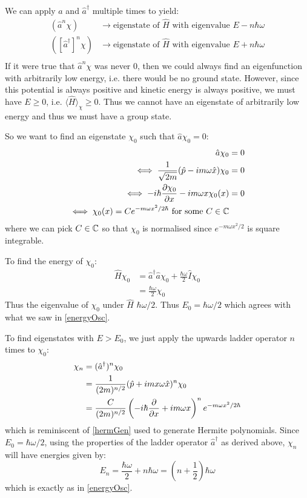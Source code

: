 \documentclass[../main.tex]{subfiles}
\begin{document}
We can apply $\hat{a}$ and $\hat{a}^{\dag}$ multiple times to yield:
\begin{align*}
  (\hat{a}^{n} \chi) &\to \text{eigenstate of $\hat{H}$ with eigenvalue } E - n \hbar \omega \\
  ([\hat{a}^{\dag}]^{n} \chi) &\to \text{eigenstate of $\hat{H}$ with eigenvalue } E + n \hbar \omega \\
\end{align*}
If it were true that $\hat{a}^{n} \chi$ was never 0, then we could always find an eigenfunction with arbitrarily low energy, i.e. there would be no ground state.
However, since this potential is always positive and kinetic energy is always positive, we must have $E \geq 0$, i.e. $\langle \hat{H} \rangle_{\chi} \geq 0$.
Thus we cannot have an eigenstate of arbitrarily low energy and thus we must have a group state.

So we want to find an eigenstate $\chi_0$ such that $\hat{a} \chi_0 = 0$:
\begin{align*}
  \hat{a} \chi_0 &= 0 \\
  \iff \frac{1}{\sqrt{2m}}(\hat{p} - im\omega\hat{x})\chi_0 &= 0 \\
  \iff -i\hbar \pderiv{\chi_0}{x} - im\omega x\chi_{0}(x) &= 0 \\
  \iff \chi_0(x) = Ce^{-m\omega x^2/2\hbar} \text{ for some } C \in \C
\end{align*}
where we can pick $C \in \mathbb{C}$ so that $\chi_0$ is normalised since $e^{-m\omega x^2/2}$ is square integrable.

To find the energy of $\chi_0$:
\begin{align*}
  \hat{H} \chi_0 &= \hat{a}^{\dag} \hat{a} \chi_0 + \frac{\hbar \omega}{2} \hat{I} \chi_0 \\
                 &= \frac{\hbar \omega}{2} \chi_0
\end{align*}
Thus the eigenvalue of $\chi_0$ under $\hat{H}$ $\hbar\omega/2$.
Thus $E_0 = \hbar \omega/2$ which agrees with what we saw in \cref{energyOsc}.

To find eigenstates with $E > E_0$, we just apply the upwards ladder operator $n$ times to $\chi_0$:
\begin{align*}
  \chi_n &= (\hat{a}^{\dag})^{n} \chi_0 \\
         &= \frac{1}{(2m)^{n/2}} (\hat{p} + imx\omega \hat{x})^{n}\chi_0 \\
         &= \frac{C}{(2m)^{n/2}} \left(-i\hbar \pderiv{}{x} + im\omega x\right)^{n} e^{-m\omega x^2/2\hbar}
\end{align*}
which is reminiscent of \cref{hermGen} used to generate Hermite polynomials.
Since $E_0 = \hbar\omega/2$, using the properties of the ladder operator $\hat{a}^{\dag}$ as derived above, $\chi_n$ will have energies given by:
\[
  E_n = \frac{\hbar \omega}{2} + n\hbar \omega = \left(n + \frac{1}{2}\right)\hbar\omega
\]
which is exactly as in \cref{energyOsc}.
\end{document}
